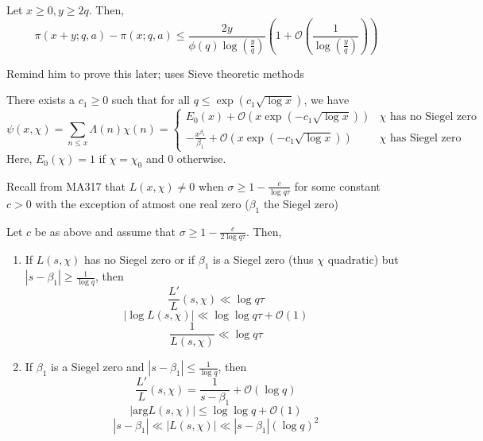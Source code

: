 \documentclass[oneside, 12pt]{scrbook}
\theoremstyle{theorem}
\begin{document}
\begin{theorem}
Let $x\geq 0, y \geq 2q$. Then, $$\pi(x+y; q,a) - \pi (x; q,a) \le \frac{2y}{\phi(q) \log (\frac{y}{q})} \left( 1 + \mathcal{O}(\frac{1}{\log (\frac{y}{q})}) \right)$$
\end{theorem}

\textcolor{BrickRed}{Remind him to prove this later; uses Sieve theoretic methods}

\begin{theorem}
There exists a $c_{1} \geq 0$ such that for all $q \le \exp (c_{1} \sqrt{\log x})$, we have $$\psi(x, \chi) = \sum_{n \le x}\Lambda (n) \chi (n) = \begin{cases} E_{0}(x) + \mathcal{O} (x\exp(-c_{1}\sqrt{\log x})) & \chi \text{ has no Siegel zero} \\ -\frac{x^{\beta_{1}}}{\beta_{1}} + \mathcal{O} (x\exp(-c_{1}\sqrt{\log x})) & \chi \text{ has Siegel zero} \end{cases}$$ Here, $E_{0}(\chi) = 1$ if $\chi = \chi_{0}$ and $0$ otherwise. 
\end{theorem}

Recall from MA317 that $L(x,\chi) \neq 0$ when $\sigma \geq  1 - \frac{c}{\log q\tau}$ for some constant $c>0$ with the exception of atmost one real zero ($\beta_{1}$ the Siegel zero)

\begin{proposition}
Let $c$ be as above and assume that $\sigma \geq 1 - \frac{c}{2 \log q \tau}$. Then, 
\begin{enumerate}
\item If $L(s,\chi)$ has no Siegel zero or if $\beta_{1}$ is a Siegel zero (thus $\chi$ quadratic) but $|s- \beta_{1}| \geq \frac{1}{\log q}$, then $$\frac{L'}{L}(s, \chi) \ll \log q \tau$$ $$|\log L(s,\chi)| \ll \log \log q\tau + \mathcal{O}(1)$$ $$\frac{1}{L(s,\chi)} \ll \log q\tau$$
\item If $\beta_{1}$ is a Siegel zero and $|s - \beta_{1}| \le \frac{1}{\log q}$, then $$\frac{L'}{L}(s, \chi) = \frac{1}{s- \beta_{1}} + \mathcal{O}(\log q)$$ $$|\mathrm{arg} L(s,\chi)| \le \log \log q + \mathcal{O}(1)$$ $$|s- \beta_{1}| \ll |L(s,\chi)| \ll |s-\beta_{1}|(\log q)^2$$
\end{enumerate}
\end{proposition}
\end{document}
